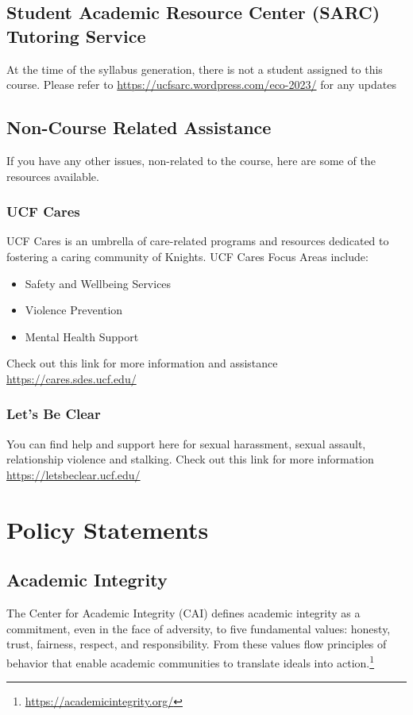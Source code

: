 \documentclass[11pt]{paper}
\begin{document}
\subsection{Student Academic Resource Center (SARC) Tutoring Service}

At the time of the syllabus generation, there is not a student assigned to this course. Please refer to \href{https://ucfsarc.wordpress.com/eco-2023/}{https://ucfsarc.wordpress.com/eco-2023/} for any updates

\subsection{Non-Course Related Assistance}

If you have any other issues, non-related to the course, here are some of the resources available.

\subsubsection{UCF Cares}

UCF Cares is an umbrella of care-related programs and resources dedicated to fostering a caring community of Knights. UCF Cares Focus Areas include:
\begin{itemize}
\item Safety and Wellbeing Services
\item Violence Prevention
\item Mental Health Support
\end{itemize}

Check out this link for more information and assistance \href{https://cares.sdes.ucf.edu/}{https://cares.sdes.ucf.edu/}


\subsubsection{Let's Be Clear}

You can find help and support here for sexual harassment, sexual assault, relationship violence and stalking. Check out this link for more information \href{https://letsbeclear.ucf.edu/}{https://letsbeclear.ucf.edu/}

\section{Policy Statements}
\subsection{Academic Integrity}
The Center for Academic Integrity (CAI) defines academic integrity as a commitment, even in the face of adversity, to five fundamental values: honesty, trust, fairness, respect, and responsibility. From these values flow principles of behavior that enable academic communities to translate ideals into action.\footnote{\url{https://academicintegrity.org/}}\\
\end{document}
